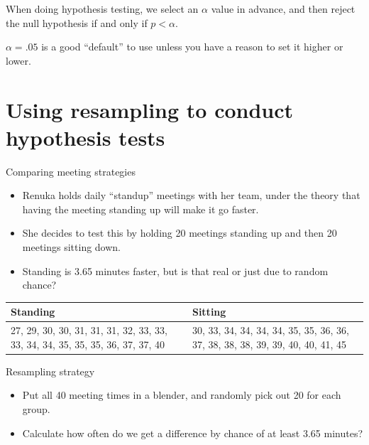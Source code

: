 \documentclass{beamer}\usepackage[]{graphicx}\usepackage[]{color}
\begin{document}
\begin{darkframes}
    \begin{frame}
     
      When doing hypothesis testing, we select an $\alpha$ value in advance, and then reject the null hypothesis if and only if $p<\alpha$.
      \pause\bigskip
      
      $\alpha=.05$ is a good ``default'' to use unless you have a reason to set it higher or lower.
    \end{frame}

    \section{Using resampling to conduct hypothesis tests}

    \begin{frame}{Comparing meeting strategies}
      \begin{itemize}
        \item Renuka holds daily ``standup'' meetings with her team, under the theory that having the meeting standing up will make it go faster.
        \item She decides to test this by holding 20 meetings standing up and then 20 meetings sitting down.
        \item Standing is 3.65 minutes faster, but is that real or just due to random chance?
      \end{itemize}
      \begin{center}
        \begin{tabular}{p{2in}p{2in}}
          Standing & Sitting \\
          \hline
          27, 29, 30, 30, 31, 31, 31, 32, 33, 33, 33, 34, 34, 35, 35, 35, 36, 37, 37, 40 &
          30, 33, 34, 34, 34, 34, 35, 35, 36, 36, 37, 38, 38, 38, 39, 39, 40, 40, 41, 45 \\
        \end{tabular}
      \end{center}
    \end{frame}

    \begin{frame}{Resampling strategy}
      \begin{itemize}
        \item Put all 40 meeting times in a blender, and randomly pick out 20 for each group.
        \item Calculate how often do we get a difference by chance of at least 3.65 minutes?
      \end{itemize}
    \end{frame}


\end{darkframes}
\end{document}
